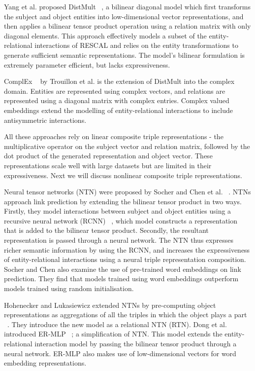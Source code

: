 \noindent Yang et al. proposed DistMult \unskip~\citep{yang2014embedding}, a bilinear diagonal model which first transforms the subject and object entities into low-dimensional vector representations, and then applies a bilinear tensor product operation using a relation matrix with only diagonal elements. This approach effectively models a subset of the entity-relational interactions of RESCAL and relies on the entity transformations to generate sufficient semantic representations. The model's bilinear formulation is extremely parameter efficient, but lacks expressiveness. \par

\noindent ComplEx \unskip~\citep{trouillon2016complex} by Trouillon et al. is the extension of DistMult into the complex domain. Entities are represented using complex vectors, and relations are represented using a diagonal matrix with complex entries. Complex valued embeddings extend the modelling of entity-relational interactions to include antisymmetric interactions. \par

\noindent All these approaches rely on linear composite triple representations - the multiplicative operator on the subject vector and relation matrix, followed by the dot product of the generated representation and object vector. These representations scale well with large datasets but are limited in their expressiveness. Next we will discuss nonlinear composite triple representations. \par

\noindent Neural tensor networks (NTN) were proposed by Socher and Chen et al. \unskip~\citep{socher2013reasoning}. NTNs approach link prediction by extending the bilinear tensor product in two ways. Firstly, they model interactions between subject and object entities using a recursive neural network (RCNN) \unskip~\citep{socher2012semantic}, which model constructs a representation that is added to the bilinear tensor product. Secondly, the resultant representation is passed through a neural network. The NTN thus expresses richer semantic information by using the RCNN, and increases the expressiveness of entity-relational interactions using a neural triple representation composition. Socher and Chen also examine the use of pre-trained word embeddings on link prediction. They find that models trained using word embeddings outperform models trained using random initialisation. \par

\noindent Hohenecker and Lukasiewicz extended NTNs by pre-computing object representations as aggregations of all the triples in which the object plays a part \unskip~\citep{hohenecker2017deep}. They introduce the new model as a relational NTN (RTN). Dong et al. introduced ER-MLP \unskip~\citep{dong2014knowledge, nickel2015review}; a simplification of NTN. This model extends the entity-relational interaction model by passing the bilinear tensor product through a neural network. ER-MLP also makes use of low-dimensional vectors for word embedding representations. \par

